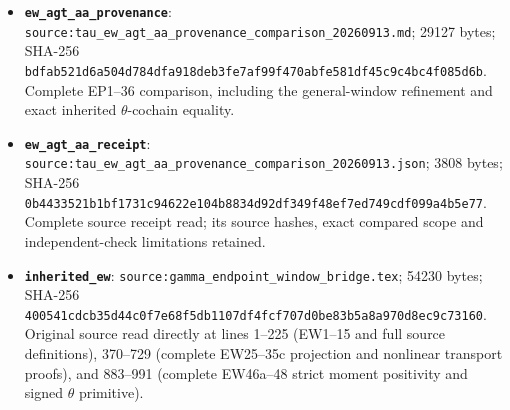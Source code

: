\begin{itemize}
  unchanged.
\item
  \textbf{\nolinkurl{ew_agt_aa_provenance}}:
  \nolinkurl{source:tau_ew_agt_aa_provenance_comparison_20260913.md};
  29127 bytes; SHA-256
  \nolinkurl{bdfab521d6a504d784dfa918deb3fe7af99f470abfe581df45c9c4bc4f085d6b}.
  Complete EP1--36 comparison, including the general-window refinement
  and exact inherited \(\theta\)-cochain equality.
\item
  \textbf{\nolinkurl{ew_agt_aa_receipt}}:
  \nolinkurl{source:tau_ew_agt_aa_provenance_comparison_20260913.json};
  3808 bytes; SHA-256
  \nolinkurl{0b4433521b1bf1731c94622e104b8834d92df349f48ef7ed749cdf099a4b5e77}.
  Complete source receipt read; its source hashes, exact compared scope
  and independent-check limitations retained.
\item
  \textbf{\nolinkurl{inherited_ew}}:
  \nolinkurl{source:gamma_endpoint_window_bridge.tex}; 54230 bytes;
  SHA-256
  \nolinkurl{400541cdcb35d44c0f7e68f5db1107df4fcf707d0be83b5a8a970d8ec9c73160}.
  Original source read directly at lines 1--225 (EW1--15 and full source
  definitions), 370--729 (complete EW25--35c projection and nonlinear
  transport proofs), and 883--991 (complete EW46a--48 strict moment
  positivity and signed \(\theta\) primitive).
\end{itemize}
